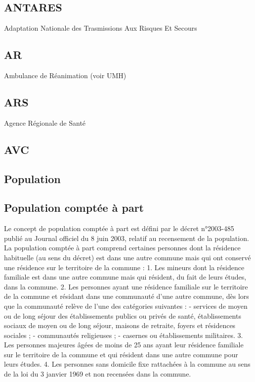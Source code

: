 \documentclass[12pt,english,french,twoside]{report}\usepackage[]{graphicx}\usepackage[]{color}
\begin{document}
\subsection*{ANTARES}
Adaptation Nationale des Trasmissions Aux Risques Et Secours

\subsection*{AR}
Ambulance de Réanimation (voir UMH)

\subsection*{ARS}
Agence Régionale de Santé

\subsection*{AVC}

\subsection*{Population}

\subsection*{Population comptée à part}
Le concept de population comptée à part est défini par le décret n°2003-485 publié au Journal officiel du 8 juin 2003, relatif au recensement de la population.
La population comptée à part comprend certaines personnes dont la résidence habituelle (au sens du décret) est dans une autre commune mais qui ont conservé une résidence sur le territoire de la commune :
1. Les mineurs dont la résidence familiale est dans une autre commune mais qui résident, du fait de leurs études, dans la commune.
2. Les personnes ayant une résidence familiale sur le territoire de la commune et résidant dans une communauté d'une autre commune, dès lors que la communauté relève de l'une des catégories suivantes :
- services de moyen ou de long séjour des établissements publics ou privés de santé, établissements sociaux de moyen ou de long séjour, maisons de retraite, foyers et résidences sociales ;
- communautés religieuses ;
- casernes ou établissements militaires.
3. Les personnes majeures âgées de moins de 25 ans ayant leur résidence familiale sur le territoire de la commune et qui résident dans une autre commune pour leurs études.
4. Les personnes sans domicile fixe rattachées à la commune au sens de la loi du 3 janvier 1969 et non recensées dans la commune. \cite{8}
\end{document}
